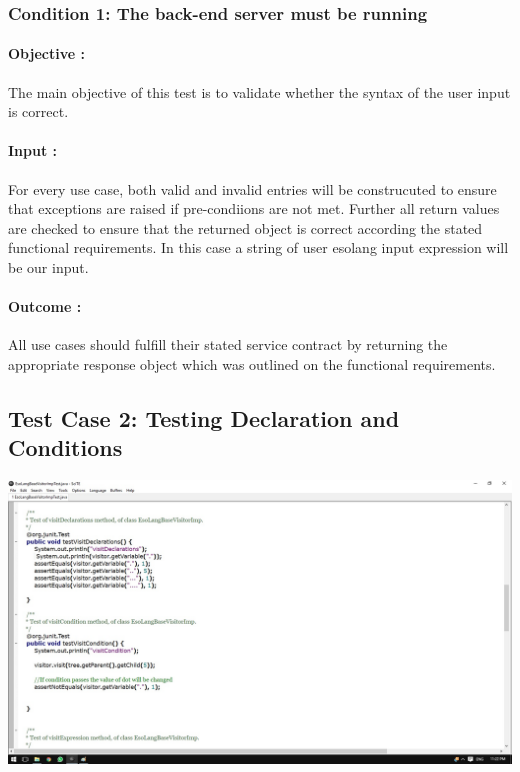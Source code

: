 \documentclass[english]{article}
\begin{document}
			\subsubsection{Condition 1: The back-end server must be running } 
			\paragraph{Objective :} The main objective of this test is to validate whether the syntax of the user input is correct.
			\paragraph{Input :} For every use case, both valid and invalid entries will be construcuted to ensure that exceptions are raised if pre-condiions are not met. Further all return values are checked to ensure that the returned object is correct according the stated
			functional requirements. In this case a string of user  esolang input expression will be our input.
			
			\paragraph{Outcome :}All use cases should fulfill their stated service contract by returning the appropriate response object  which was outlined on the functional requirements.\\
			
		
			 
			
			\subsection{Test Case 2: Testing Declaration and Conditions} 
						\includegraphics[width=\linewidth]{test2.jpg}
\end{document}
